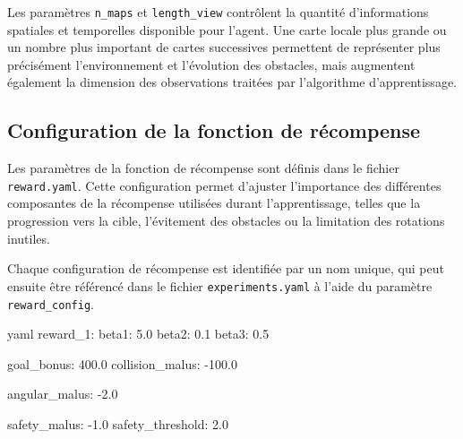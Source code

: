 \begin{tcolorbox}[colback=YellowGreen!5,colframe=YellowGreen,title=Remarque]
    Les paramètres \texttt{n\_maps} et \texttt{length\_view} contrôlent la quantité d'informations spatiales et temporelles disponible pour l'agent. Une carte locale plus grande ou un nombre plus important de cartes successives permettent de représenter plus précisément l'environnement et l'évolution des obstacles, mais augmentent également la dimension des observations traitées par l'algorithme d'apprentissage.
\end{tcolorbox}


\subsection{Configuration de la fonction de récompense}

\noindent Les paramètres de la fonction de récompense sont définis dans le fichier \texttt{reward.yaml}. Cette configuration permet d'ajuster l'importance des différentes composantes de la récompense utilisées durant l'apprentissage, telles que la progression vers la cible, l'évitement des obstacles ou la limitation des rotations inutiles.

\vspace{10pt}

\noindent Chaque configuration de récompense est identifiée par un nom unique, qui peut ensuite être référencé dans le fichier \texttt{experiments.yaml} à l'aide du paramètre \texttt{reward\_config}.

\begin{codebox}{yaml}
reward_1:
  beta1: 5.0
  beta2: 0.1
  beta3: 0.5

  goal_bonus: 400.0
  collision_malus: -100.0

  angular_malus: -2.0

  safety_malus: -1.0
  safety_threshold: 2.0
\end{codebox}

